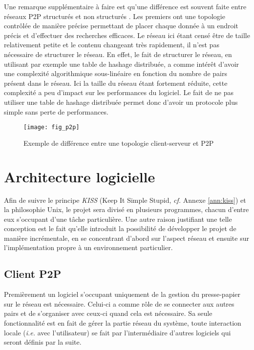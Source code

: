 Une remarque supplémentaire à faire est qu'une différence est souvent faite
entre réseaux P2P structurés et non structurés \cite{AS04, Lua05asurvey}.
Les premiers ont une topologie contrôlée de manière précise permettant
de placer chaque donnée à un endroit précis et d'effectuer des recherches
efficaces. Le réseau ici étant censé être de taille relativement petite
et le contenu changeant très rapidement, il n'est pas nécessaire de structurer
le réseau. En effet, le fait de structurer le réseau, en utilisant par exemple
une table de hashage distribuée, a comme intérêt d'avoir une complexité
algorithmique sous-linéaire en fonction du nombre de pairs présent dans
le réseau. Ici la taille du réseau étant fortement réduite, cette
complexité a peu d'impact sur les performances du logiciel. Le fait de ne
pas utiliser une table de hashage distribuée permet donc d'avoir un protocole
plus simple sans perte de performances.

\begin{figure}[!h]
  \centering
  \texttt{[image: fig\_p2p]}
  \caption{Exemple de différence entre une topologie client-serveur et P2P}
  \label{fig:p2p}
\end{figure}

\section{Architecture logicielle}
Afin de suivre le principe \emph{KISS} (Keep It Simple Stupid, \emph{cf.}
Annexe \ref{ann:kiss}) et la philosophie Unix, le projet sera divisé en
plusieurs programmes, chacun d'entre eux s'occupant d'une tâche particulière.
Une autre raison justifiant une telle conception est le fait qu'elle introduit
la possibilité de développer le projet de manière incrémentale, en se
concentrant d'abord sur l'aspect réseau et ensuite sur l'implémentation
propre à un environnement particulier.

\subsection{Client P2P}
Premièrement un logiciel s'occupant uniquement de la gestion du presse-papier
sur le réseau est nécessaire. Celui-ci a comme rôle de se connecter aux
autres pairs et de s'organiser avec ceux-ci quand cela est nécessaire.
Sa seule fonctionnalité est en fait de gérer la partie réseau du système,
toute interaction locale (\emph{i.e.} avec l'utilisateur) se fait par
l'intermédiaire d'autres logiciels qui seront définis par la suite.

